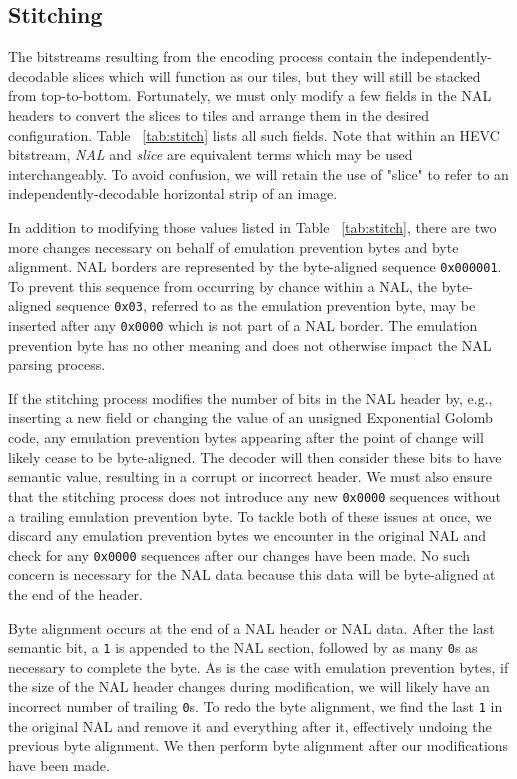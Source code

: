 \subsection{Stitching}
The bitstreams resulting from the encoding process contain the independently-decodable slices which will function as our tiles, but they will still be stacked from top-to-bottom. Fortunately, we must only modify a few fields in the NAL headers to convert the slices to tiles and arrange them in the desired configuration. Table ~\ref{tab:stitch} lists all such fields. Note that within an HEVC bitstream, \textit{NAL} and \textit{slice} are equivalent terms which may be used interchangeably. To avoid confusion, we will retain the use of "slice" to refer to an independently-decodable horizontal strip of an image.

In addition to modifying those values listed in Table ~\ref{tab:stitch}, there are two more changes necessary on behalf of emulation prevention bytes and byte alignment. NAL borders are represented by the byte-aligned sequence \texttt{0x000001}. To prevent this sequence from occurring by chance within a NAL, the byte-aligned sequence \texttt{0x03}, referred to as the emulation prevention byte, may be inserted after any \texttt{0x0000} which is not part of a NAL border. The emulation prevention byte has no other meaning and does not otherwise impact the NAL parsing process.

If the stitching process modifies the number of bits in the NAL header by, e.g., inserting a new field or changing the value of an unsigned Exponential Golomb code, any emulation prevention bytes appearing after the point of change will likely cease to be byte-aligned. The decoder will then consider these bits to have semantic value, resulting in a corrupt or incorrect header. We must also ensure that the stitching process does not introduce any new \texttt{0x0000} sequences without a trailing emulation prevention byte. To tackle both of these issues at once, we discard any emulation prevention bytes we encounter in the original NAL and check for any \texttt{0x0000} sequences after our changes have been made. No such concern is necessary for the NAL data because this data will be byte-aligned at the end of the header.

Byte alignment occurs at the end of a NAL header or NAL data. After the last semantic bit, a \texttt{1} is appended to the NAL section, followed by as many \texttt{0}s as necessary to complete the byte. As is the case with emulation prevention bytes, if the size of the NAL header changes during modification, we will likely have an incorrect number of trailing \texttt{0}s. To redo the byte alignment, we find the last \texttt{1} in the original NAL and remove it and everything after it, effectively undoing the previous byte alignment. We then perform byte alignment after our modifications have been made.

